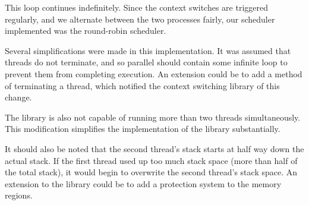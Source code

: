 \documentclass[a4paper,10pt]{article}
\begin{document}
This loop continues indefinitely. Since the context switches are triggered
regularly, and we alternate between the two processes fairly, our scheduler
implemented was the round-robin scheduler.

Several simplifications were made in this implementation. It was assumed that
threads do not terminate, and so parallel should contain some infinite loop to
prevent them from completing execution. An extension could be to add a method
of terminating a thread, which notified the context switching library of this
change.

The library is also not capable of running more than two threads
simultaneously. This modification simplifies the implementation of the library
substantially.

It should also be noted that the second thread's stack starts at half way down
the actual stack. If the first thread used up too much stack space (more than
half of the total stack), it would begin to overwrite the second thread's
stack space. An extension to the library could be to add a protection system
to the memory regions.
\end{document}
